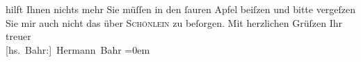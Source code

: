 \begin{ledgroupsized}[t]{13cm}
               hilft Ihnen nichts mehr Sie müſſen in den ſauren Apfel beiſzen und bitte vergeſzen
               Sie mir auch nicht das \label{K_L00278_1v}\label{K_L00278_1h} über \textsc{Schönlein} zu beſorgen.\pend
           \pstart
           Mit herzlichen Grüſzen Ihr treuer{\\[\baselineskip]}\spacefill\mbox{{[}hs. Bahr:{]} Hermann Bahr}\pend
           \leftskip=0em{}
         
         \endnumbering{}\end{ledgroupsized}  \newcommand{\dateiname}{L00278}\newcommand{\titel}{Hermann Bahr an Arthur Schnitzler, 3. 11. 1893}\newcommand{\editorInnen}{ Kurt Ifkovits,  Martin Anton Müller}
      